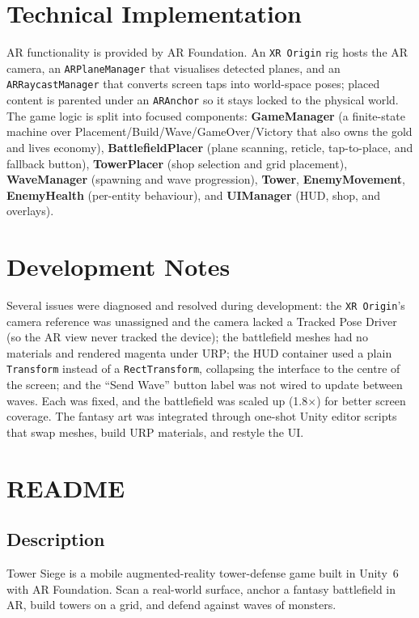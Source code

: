 \documentclass[11pt,a4paper]{article}
\begin{document}
\section{Technical Implementation}
AR functionality is provided by AR Foundation. An \texttt{XR Origin} rig hosts the AR camera, an \texttt{ARPlaneManager} that visualises detected planes, and an \texttt{ARRaycastManager} that converts screen taps into world-space poses; placed content is parented under an \texttt{ARAnchor} so it stays locked to the physical world. The game logic is split into focused components: \textbf{GameManager} (a finite-state machine over Placement/Build/Wave/GameOver/Victory that also owns the gold and lives economy), \textbf{BattlefieldPlacer} (plane scanning, reticle, tap-to-place, and fallback button), \textbf{TowerPlacer} (shop selection and grid placement), \textbf{WaveManager} (spawning and wave progression), \textbf{Tower}, \textbf{EnemyMovement}, \textbf{EnemyHealth} (per-entity behaviour), and \textbf{UIManager} (HUD, shop, and overlays).

\section{Development Notes}
Several issues were diagnosed and resolved during development: the \texttt{XR Origin}'s camera reference was unassigned and the camera lacked a Tracked Pose Driver (so the AR view never tracked the device); the battlefield meshes had no materials and rendered magenta under URP; the HUD container used a plain \texttt{Transform} instead of a \texttt{RectTransform}, collapsing the interface to the centre of the screen; and the ``Send Wave'' button label was not wired to update between waves. Each was fixed, and the battlefield was scaled up (1.8$\times$) for better screen coverage. The fantasy art was integrated through one-shot Unity editor scripts that swap meshes, build URP materials, and restyle the UI.

\section{README}
\label{sec:readme}

\subsection*{Description}
Tower Siege is a mobile augmented-reality tower-defense game built in Unity~6 with AR Foundation. Scan a real-world surface, anchor a fantasy battlefield in AR, build towers on a grid, and defend against waves of monsters.
\end{document}
